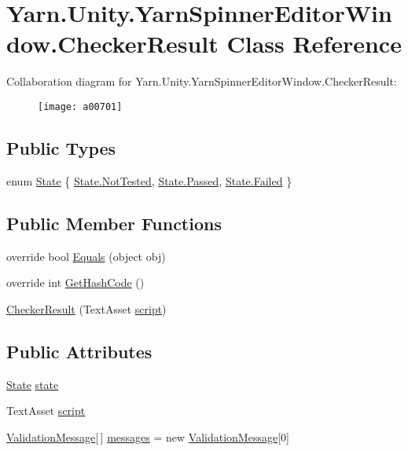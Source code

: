 \hypertarget{a00047}{\section{Yarn.\-Unity.\-Yarn\-Spinner\-Editor\-Window.\-Checker\-Result Class Reference}
\label{a00047}
}


Collaboration diagram for Yarn.\-Unity.\-Yarn\-Spinner\-Editor\-Window.\-Checker\-Result\-:
\nopagebreak
\begin{figure}[H]
\begin{center}
\leavevmode
\texttt{[image: a00701]}
\end{center}
\end{figure}
\subsection*{Public Types}
\begin{DoxyCompactItemize}
\item 
enum \hyperlink{a00047_ab24848d7951ce44eb3c7768c6ee10385}{State} \{ \hyperlink{a00047_ab24848d7951ce44eb3c7768c6ee10385a0197c47523ba5a2bdfef705786687de5}{State.\-Not\-Tested}, 
\hyperlink{a00047_ab24848d7951ce44eb3c7768c6ee10385aa0d0628f6b4e4d78d2ffef4d4d1c4b15}{State.\-Passed}, 
\hyperlink{a00047_ab24848d7951ce44eb3c7768c6ee10385ad7c8c85bf79bbe1b7188497c32c3b0ca}{State.\-Failed}
 \}
\end{DoxyCompactItemize}
\subsection*{Public Member Functions}
\begin{DoxyCompactItemize}
\item 
override bool \hyperlink{a00047_a1e653caad5ab99847c26ff8f67da8f45}{Equals} (object obj)
\item 
override int \hyperlink{a00047_a85d50993390cdd8ba30ac44043b18de7}{Get\-Hash\-Code} ()
\item 
\hyperlink{a00047_af1c9b3d1757d33ad2141c639c3827c97}{Checker\-Result} (Text\-Asset \hyperlink{a00047_a6c852f7521c0a91b519aa3d391f63e6b}{script})
\end{DoxyCompactItemize}
\subsection*{Public Attributes}
\begin{DoxyCompactItemize}
\item 
\hyperlink{a00047_ab24848d7951ce44eb3c7768c6ee10385}{State} \hyperlink{a00047_a7202b24bd068da24d7e28bec5668b13a}{state}
\item 
Text\-Asset \hyperlink{a00047_a6c852f7521c0a91b519aa3d391f63e6b}{script}
\item 
\hyperlink{a00164_a00355}{Validation\-Message}\mbox{[}$\,$\mbox{]} \hyperlink{a00047_a808a039e280cf875cb3c9e9385148498}{messages} = new \hyperlink{a00164_a00355}{Validation\-Message}\mbox{[}0\mbox{]}
\end{DoxyCompactItemize}


